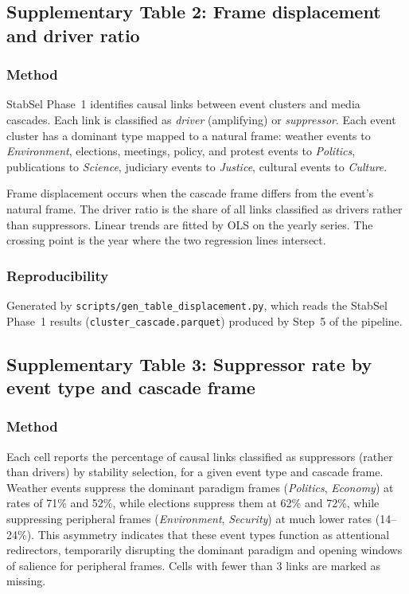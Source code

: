 \documentclass[11pt]{article}
\begin{document}

\newpage
\subsection*{Supplementary Table 2: Frame displacement and driver ratio}



\subsubsection*{Method}
StabSel Phase~1 identifies causal links between event clusters and media cascades. Each link is classified as \emph{driver} (amplifying) or \emph{suppressor}. Each event cluster has a dominant type mapped to a natural frame: weather events to \emph{Environment}, elections, meetings, policy, and protest events to \emph{Politics}, publications to \emph{Science}, judiciary events to \emph{Justice}, cultural events to \emph{Culture}.

Frame displacement occurs when the cascade frame differs from the event's natural frame. The driver ratio is the share of all links classified as drivers rather than suppressors. Linear trends are fitted by OLS on the yearly series. The crossing point is the year where the two regression lines intersect.

\subsubsection*{Reproducibility}
Generated by \texttt{scripts/gen\_table\_displacement.py}, which reads the StabSel Phase~1 results (\texttt{cluster\_cascade.parquet}) produced by Step~5 of the pipeline.


\newpage
\subsection*{Supplementary Table 3: Suppressor rate by event type and cascade frame}



\subsubsection*{Method}
Each cell reports the percentage of causal links classified as suppressors (rather than drivers) by stability selection, for a given event type and cascade frame. Weather events suppress the dominant paradigm frames (\emph{Politics}, \emph{Economy}) at rates of 71\% and 52\%, while elections suppress them at 62\% and 72\%, while suppressing peripheral frames (\emph{Environment}, \emph{Security}) at much lower rates (14--24\%). This asymmetry indicates that these event types function as attentional redirectors, temporarily disrupting the dominant paradigm and opening windows of salience for peripheral frames. Cells with fewer than 3 links are marked as missing.
\end{document}
